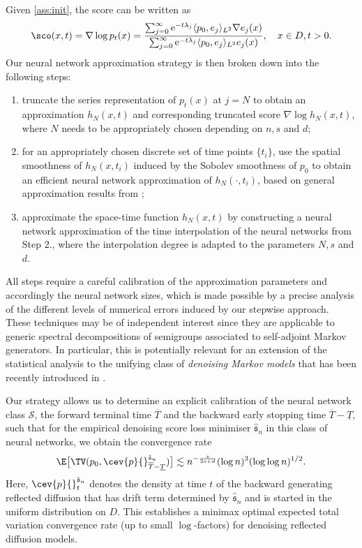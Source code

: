 \documentclass[a4paper, 11pt, headings = small, abstract]{scrartcl}
\begin{document}
Given \ref{ass:init}, the score can be written as 
\[\sco(x,t) = \nabla \log p_t(x) = \frac{\sum_{j=0}^\infty \mathrm{e}^{-t\lambda_j}  \langle p_0, e_j\rangle_{L^2} \nabla e_j(x)}{\sum_{j=0}^\infty \mathrm{e}^{-t\lambda_j} \langle p_0, e_j \rangle_{L^2} e_j(x)}, \quad x \in D, t > 0.\]
Our neural network approximation strategy is then broken down into the following steps: 
\begin{enumerate} 
\item truncate the series representation of $p_t(x)$ at $j=N$ to obtain an approximation $h_N(x,t)$ and corresponding truncated score $\nabla \log h_N(x,t)$, where $N$ needs to be appropriately chosen depending on $n,s$ and $d$;
\item for an appropriately chosen discrete set of time points $\{t_i\}$, use the spatial smoothness of $h_N(x, t_i)$ induced by the Sobolev smoothness of $p_0$ to obtain an efficient neural network approximation of $h_N(\cdot, t_i)$, based on general approximation results from \cite{suzuki19};
\item approximate the space-time function $h_N(x,t)$ by constructing a neural network approximation of the time interpolation of the neural networks from Step 2., where the interpolation degree is adapted to the parameters $N,s$ and $d$.
\end{enumerate}
All steps require a careful calibration of the approximation parameters and accordingly the neural network sizes, which is made possible by a precise analysis of the different levels of numerical errors induced by our stepwise approach. These techniques may be of independent interest since they are applicable to generic spectral decompositions of semigroups associated to self-adjoint Markov generators. In  particular, this is potentially relevant for an extension of the statistical analysis to the unifying class of \textit{denoising Markov models} that has been recently introduced in \cite{benton_shi24}.

Our strategy allows us to determine an explicit calibration of the neural network class $\mathcal{S}$, the forward terminal time $\overline{T}$ and the backward early stopping time $\overline{T} - \underline{T}$, such that for the empirical denoising score loss minimiser $\hat{\mathfrak{s}}_n$ in this class of neural networks, we obtain the convergence rate 
\[\E\big[\TV(p_0,\cev{p}{}^{\hat{\mathfrak{s}}_n}_{\overline{T}- \underline{T}})\big] \lesssim n^{-\frac{s}{2s+d}} (\log n)^{3} (\log \log n)^{1/2}.\]
Here, $\cev{p}{}^{\hat{\mathfrak{s}}_n}_t$ denotes the density at time $t$ of the backward generating reflected diffusion that has drift term determined by $\hat{\mathfrak{s}}_n$ and is started in the uniform distribution on $D$. This establishes a minimax optimal expected total variation convergence rate (up to small $\log$-factors) for denoising reflected diffusion models.
\end{document}
